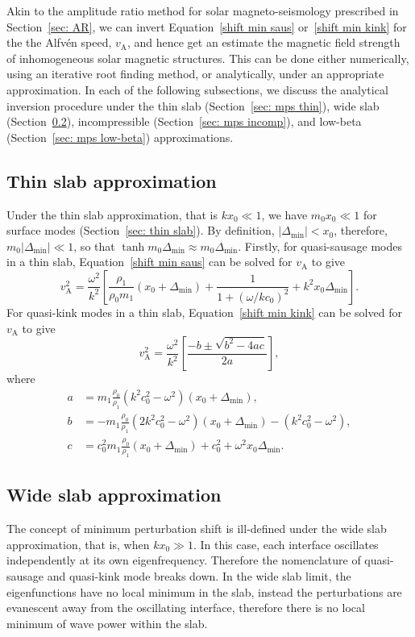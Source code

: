 Akin to the amplitude ratio method for solar magneto-seismology prescribed in Section~\ref{sec: AR}, we can invert Equation~\eqref{shift min saus} or~\eqref{shift min kink} for the the Alfv\'{e}n speed, $v_\textrm{A}$, and hence get an estimate the magnetic field strength of inhomogeneous solar magnetic structures. This can be done either numerically, using an iterative root finding method, or analytically, under an appropriate approximation. In each of the following subsections, we discuss the analytical inversion procedure under the thin slab (Section~\ref{sec: mps thin}), wide slab (Section~\ref{sec: mps wide}), incompressible (Section~\ref{sec: mps incomp}), and low-beta (Section~\ref{sec: mps low-beta}) approximations.


\subsection{Thin slab approximation} \label{sec: MPS thin}
Under the thin slab approximation, that is $kx_0 \ll 1$, we have $m_0x_0 \ll 1$ for surface modes (Section~\ref{sec: thin slab}). By definition, $|\Delta_\textrm{min}| < x_0$, therefore, $m_0|\Delta_\textrm{min}| \ll 1$, so that $\tanh{m_0\Delta_\textrm{min}} \approx m_0\Delta_\textrm{min}$. Firstly, for quasi-sausage modes in a thin slab, Equation~\eqref{shift min saus} can be solved for $v_\textrm{A}$ to give
\begin{equation}
v_\textrm{A}^2 = \frac{\omega^2}{k^2} \left[\frac{\rho_1}{\rho_0m_1}(x_0 + \Delta_\textrm{min}) + \frac{1}{1 + (\omega / kc_0)^2} + k^2x_0\Delta_\textrm{min}\right].
\end{equation}
For quasi-kink modes in a thin slab, Equation~\eqref{shift min kink} can be solved for $v_\textrm{A}$ to give
\begin{equation}
v_\textrm{A}^2 = \frac{\omega^2}{k^2}\left[\frac{-b \pm \sqrt{b^2 - 4ac}}{2a}\right],
\end{equation}
where
\begin{align}
a &= m_1\frac{\rho_0}{\rho_1}(k^2c_0^2 - \omega^2)(x_0 + \Delta_\textrm{min}), \\
b &= -m_1\frac{\rho_0}{\rho_1}(2k^2c_0^2 - \omega^2)(x_0 + \Delta_\textrm{min}) - (k^2c_0^2 - \omega^2), \\
c &= c_0^2m_1\frac{\rho_0}{\rho_1}(x_0 + \Delta_\textrm{min}) + c_0^2 + \omega^2x_0\Delta_\textrm{min}.
\end{align}


\subsection{Wide slab approximation} \label{sec: mps wide}
The concept of minimum perturbation shift is ill-defined under the wide slab approximation, that is, when $kx_0 \gg 1$. In this case, each interface oscillates independently at its own eigenfrequency. Therefore the nomenclature of quasi-sausage and quasi-kink mode breaks down. In the wide slab limit, the eigenfunctions have no local minimum in the slab, instead the perturbations are evanescent away from the oscillating interface, therefore there is no local minimum of wave power within the slab.



